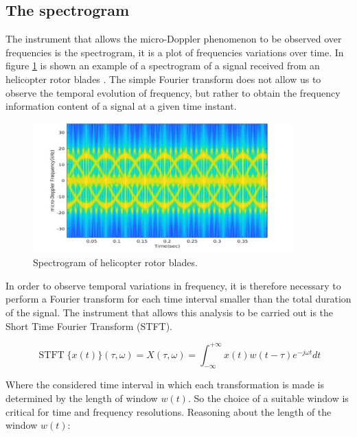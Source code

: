 \subsection{The spectrogram}
The instrument that allows the micro-Doppler phenomenon to be observed over frequencies is the spectrogram, it is a plot of frequencies variations over time. In figure \ref{spect_helicopter} is shown an example of a spectrogram of a signal received from an helicopter rotor blades \cite{md_helicopter}. The simple Fourier transform does not allow us to observe the temporal evolution of frequency, but rather to obtain the frequency information content of a signal at a given time instant. 

\begin{figure}[h!]
    \centering
    \includegraphics[width=10cm]{Time-frequency analysis-chap3/img/Spectrogram-of-modelled-helicopter-returned-echo.jpg}
    \caption{Spectrogram of helicopter rotor blades.}
    \label{spect_helicopter}
\end{figure}

In order to observe temporal variations in frequency, it is therefore necessary to perform a Fourier transform for each time interval smaller than the total duration of the signal. The instrument that allows this analysis to be carried out is the Short Time Fourier Transform (STFT).

\begin{equation}
\operatorname{STFT}\{x(t)\}(\tau, \omega)=X(\tau, \omega)=\int_{-\infty}^{+\infty} x(t) w(t-\tau) e^{-j \omega t} d t
\end{equation}

Where the considered time interval in which each transformation is made is determined by the length of window $w(t)$. So the choice of a suitable window is critical for time and frequency resolutions. Reasoning about the length of the window $w(t)$: 

